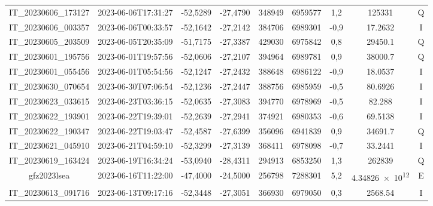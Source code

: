 \begin{center}
\begin{longtable}{ccccS[table-format=6.0]S[table-format=7.0]ccc}
IT\_20230606\_173127 & 2023-06-06T17:31:27 & -52,5289 & -27,4790 & 348949 & 6959577 & 1,2 & \num[round-precision=3,round-mode=figures,scientific-notation=true]{125331} & Q \\
IT\_20230606\_003357 & 2023-06-06T00:33:57 & -52,1642 & -27,2142 & 384706 & 6989301 & -0,9 & \num[round-precision=3,round-mode=figures,scientific-notation=true]{17.2632} & I \\
IT\_20230605\_203509 & 2023-06-05T20:35:09 & -51,7175 & -27,3387 & 429030 & 6975842 & 0,8 & \num[round-precision=3,round-mode=figures,scientific-notation=true]{29450.1} & Q \\
IT\_20230601\_195756 & 2023-06-01T19:57:56 & -52,0606 & -27,2107 & 394964 & 6989781 & 0,9 & \num[round-precision=3,round-mode=figures,scientific-notation=true]{38000.7} & Q \\
IT\_20230601\_055456 & 2023-06-01T05:54:56 & -52,1247 & -27,2432 & 388648 & 6986122 & -0,9 & \num[round-precision=3,round-mode=figures,scientific-notation=true]{18.0537} & I \\
IT\_20230630\_070654 & 2023-06-30T07:06:54 & -52,1236 & -27,2447 & 388756 & 6985959 & -0,5 & \num[round-precision=3,round-mode=figures,scientific-notation=true]{80.6926} & I \\
IT\_20230623\_033615 & 2023-06-23T03:36:15 & -52,0635 & -27,3083 & 394770 & 6978969 & -0,5 & \num[round-precision=3,round-mode=figures,scientific-notation=true]{82.288} & I \\
IT\_20230622\_193901 & 2023-06-22T19:39:01 & -52,2639 & -27,2941 & 374921 & 6980353 & -0,6 & \num[round-precision=3,round-mode=figures,scientific-notation=true]{69.5138} & I \\
IT\_20230622\_190347 & 2023-06-22T19:03:47 & -52,4587 & -27,6399 & 356096 & 6941839 & 0,9 & \num[round-precision=3,round-mode=figures,scientific-notation=true]{34691.7} & Q \\
IT\_20230621\_045910 & 2023-06-21T04:59:10 & -52,3299 & -27,3139 & 368411 & 6978098 & -0,7 & \num[round-precision=3,round-mode=figures,scientific-notation=true]{33.2441} & I \\
IT\_20230619\_163424 & 2023-06-19T16:34:24 & -53,0940 & -28,4311 & 294913 & 6853250 & 1,3 & \num[round-precision=3,round-mode=figures,scientific-notation=true]{262839} & Q \\
gfz2023lsea & 2023-06-16T11:22:00 & -47,4000 & -24,5000 & 256798 & 7288301 & 5,2 & \num[round-precision=3,round-mode=figures,scientific-notation=true]{4.34826e+12} & E \\
IT\_20230613\_091716 & 2023-06-13T09:17:16 & -52,3448 & -27,3051 & 366930 & 6979050 & 0,3 & \num[round-precision=3,round-mode=figures,scientific-notation=true]{2568.54} & I \\

\end{longtable}
\end{center}
